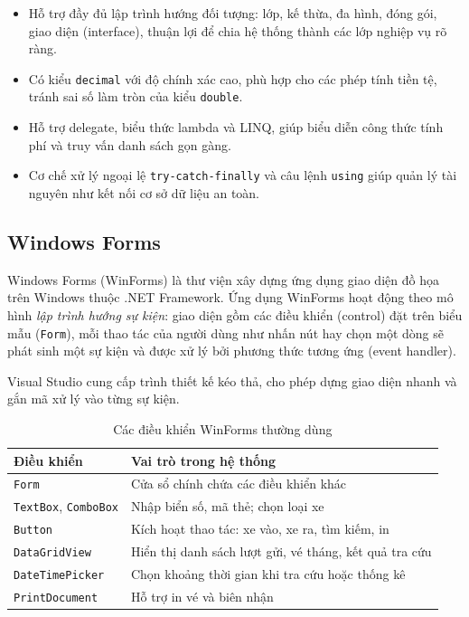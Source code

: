 \begin{itemize}
  \item Hỗ trợ đầy đủ lập trình hướng đối tượng: lớp, kế thừa, đa hình, đóng gói, giao diện (interface), thuận lợi để chia hệ thống thành các lớp nghiệp vụ rõ ràng.
  \item Có kiểu \texttt{decimal} với độ chính xác cao, phù hợp cho các phép tính tiền tệ, tránh sai số làm tròn của kiểu \texttt{double}.
  \item Hỗ trợ delegate, biểu thức lambda và LINQ, giúp biểu diễn công thức tính phí và truy vấn danh sách gọn gàng.
  \item Cơ chế xử lý ngoại lệ \texttt{try-catch-finally} và câu lệnh \texttt{using} giúp quản lý tài nguyên như kết nối cơ sở dữ liệu an toàn.
\end{itemize}

\subsection{Windows Forms}

Windows Forms (WinForms) là thư viện xây dựng ứng dụng giao diện đồ họa trên Windows thuộc .NET Framework. Ứng dụng WinForms hoạt động theo mô hình \textit{lập trình hướng sự kiện}: giao diện gồm các điều khiển (control) đặt trên biểu mẫu (\texttt{Form}), mỗi thao tác của người dùng như nhấn nút hay chọn một dòng sẽ phát sinh một sự kiện và được xử lý bởi phương thức tương ứng (event handler).

Visual Studio cung cấp trình thiết kế kéo thả, cho phép dựng giao diện nhanh và gắn mã xử lý vào từng sự kiện.


\begin{table}[h]
  \centering
  \begin{tabular}{@{}lp{9cm}@{}}
    \toprule
    \textbf{Điều khiển} & \textbf{Vai trò trong hệ thống} \\
    \midrule
    \texttt{Form} & Cửa sổ chính chứa các điều khiển khác \\
    \texttt{TextBox}, \texttt{ComboBox} & Nhập biển số, mã thẻ; chọn loại xe \\
    \texttt{Button} & Kích hoạt thao tác: xe vào, xe ra, tìm kiếm, in \\
    \texttt{DataGridView} & Hiển thị danh sách lượt gửi, vé tháng, kết quả tra cứu \\
    \texttt{DateTimePicker} & Chọn khoảng thời gian khi tra cứu hoặc thống kê \\
    \texttt{PrintDocument} & Hỗ trợ in vé và biên nhận \\
    \bottomrule
  \end{tabular}
  \caption{Các điều khiển WinForms thường dùng}
  \label{tab:controls}
\end{table}

